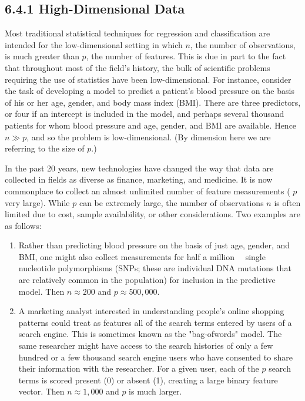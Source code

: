 \documentclass[10pt]{article}
\begin{document}
\subsection*{6.4.1 High-Dimensional Data}
Most traditional statistical techniques for regression and classification are intended for the low-dimensional setting in which $n$, the number of observations, is much greater than $p$, the number of features. This is due in part to the fact that throughout most of the field's history, the bulk of scientific problems requiring the use of statistics have been low-dimensional. For instance, consider the task of developing a model to predict a patient's blood pressure on the basis of his or her age, gender, and body mass index (BMI). There are three predictors, or four if an intercept is included in the model, and perhaps several thousand patients for whom blood pressure and age, gender, and BMI are available. Hence $n \gg p$, and so the problem is low-dimensional. (By dimension here we are referring to the size of $p$.)

In the past 20 years, new technologies have changed the way that data are collected in fields as diverse as finance, marketing, and medicine. It is now commonplace to collect an almost unlimited number of feature measurements ( $p$ very large). While $p$ can be extremely large, the number of observations $n$ is often limited due to cost, sample availability, or other considerations. Two examples are as follows:

\begin{enumerate}
  \item Rather than predicting blood pressure on the basis of just age, gender, and BMI, one might also collect measurements for half a million\
\
single nucleotide polymorphisms (SNPs; these are individual DNA mutations that are relatively common in the population) for inclusion in the predictive model. Then $n \approx 200$ and $p \approx 500,000$.
  \item A marketing analyst interested in understanding people's online shopping patterns could treat as features all of the search terms entered by users of a search engine. This is sometimes known as the "bag-ofwords" model. The same researcher might have access to the search histories of only a few hundred or a few thousand search engine users who have consented to share their information with the researcher. For a given user, each of the $p$ search terms is scored present (0) or absent (1), creating a large binary feature vector. Then $n \approx 1,000$ and $p$ is much larger.
\end{enumerate}
\end{document}
